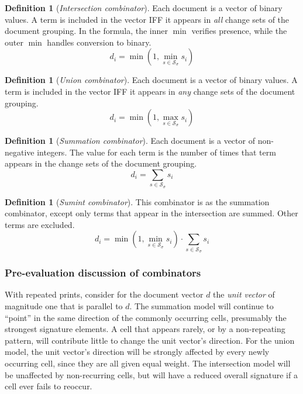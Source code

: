 \documentclass[11pt]{ucthesis}
\theoremstyle{plain}
\theoremstyle{definition}
\newtheorem{defn}[thm]{Definition} %
\begin{document}
\begin{defn}[\textit{Intersection combinator}]
Each document is a vector of binary values.  A term is included in the vector IFF it appears in \emph{all} change sets of the document grouping.  In the formula, the inner $\min$ verifies presence, while the outer $\min$ handles conversion to binary.
$$d_i = \min( 1, \min_{s \in \mathcal{S}_\sigma} s_i )$$
\end{defn}

\begin{defn}[\textit{Union combinator}]
Each document is a vector of binary values.  A term is included in the vector IFF it appears in \emph{any} change sets of the document grouping.
$$d_i = \min( 1, \max_{s \in \mathcal{S}_\sigma} s_i )$$
\end{defn}

\begin{defn}[\textit{Summation combinator}]
Each document is a vector of non-negative integers.  The value for each term is the number of times that term appears in the change sets of the document grouping.
$$d_i = \sum_{s \in \mathcal{S}_\sigma} s_i$$
\end{defn}

\begin{defn}[\textit{Sumint combinator}]
This combinator is as the summation combinator, except only terms that appear in the intersection are summed.  Other terms are excluded.
$$d_i = \min( 1, \min_{s \in \mathcal{S}_\sigma} s_i ) \cdot \sum_{s \in \mathcal{S}_\sigma} s_i$$
\end{defn}


\subsubsection*{Pre-evaluation discussion of combinators}

With repeated prints, consider for the document vector $d$ the \emph{unit vector} of magnitude one that is parallel to $d$.  The summation model will continue to ``point'' in the same direction of the commonly occurring cells, presumably the strongest signature elements.  A cell that appears rarely, or by a non-repeating pattern, will contribute little to change the unit vector's direction.  For the union model, the unit vector's direction will be strongly affected by every newly occurring cell, since they are all given equal weight.  The intersection model will be unaffected by non-recurring cells, but will have a reduced overall signature if a cell ever fails to reoccur.
\end{document}
